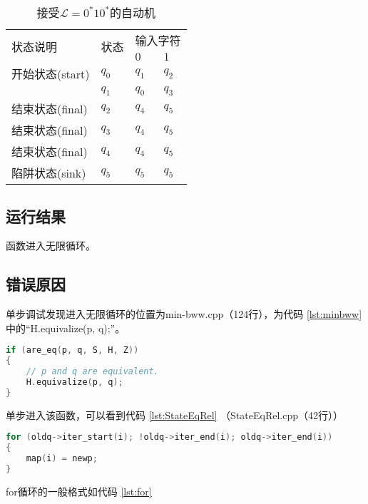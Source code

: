 \begin{table}[!htbp]
    \caption{接受{$\mathcal{L}=0^*10^*$}的自动机{\cite{book1}}}
    \label{tab:DFA4}
    \centering
    \small%
    \setlength{\tabcolsep}{4pt}%
    \renewcommand{\arraystretch}{1.2}%
        \begin{tabular}{l p{3em}<{\centering} p{3em}<{\centering} p{3em}<{\centering}}
        \toprule %
        \multirow{2}{*}{状态说明} & \multirow{2}{*}{状态} & \multicolumn{2}{c}{输入字符} \\
		\cline{3-4}      &    &$0$ & $1$  \\
        \midrule%
        开始状态(start)  & $q_0$ & $q_1$   & $q_2$   \\
                        & $q_1$ & $q_0$   & $q_3$   \\
        结束状态(final) & $q_2$ & $q_4$   & $q_5$   \\
        结束状态(final) & $q_3$ & $q_4$   & $q_5$   \\
        结束状态(final) & $q_4$ & $q_4$   & $q_5$   \\
        陷阱状态(sink) & $q_5$ & $q_5$   & $q_5$   \\
        \bottomrule%
    \end{tabular}
\end{table}

\subsection{运行结果}
函数进入无限循环。

\subsection{错误原因} 

单步调试发现进入无限循环的位置为min-bww.cpp（124行），为代码 \ref{lst:minbww} 中的“H.equivalize(p, q);”。

\begin{lstlisting}[language=C++,label={lst:minbww},caption={min-bww.cpp}]
if (are_eq(p, q, S, H, Z))
{
    // p and q are equivalent.
    H.equivalize(p, q);
}
\end{lstlisting}
单步进入该函数，可以看到代码 \ref{lst:StateEqRel} （StateEqRel.cpp（42行））

\begin{lstlisting}[language=C++,label={lst:StateEqRel},caption={StateEqRel.cpp}]
for (oldq->iter_start(i); !oldq->iter_end(i); oldq->iter_end(i))
{
    map(i) = newp;
}
\end{lstlisting}
for循环的一般格式如代码 \ref{lst:for}

